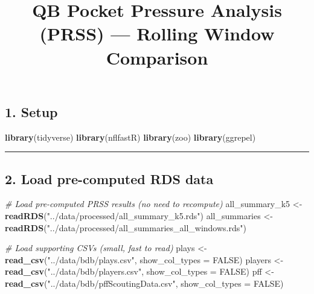 \documentclass[
]{article}
\title{QB Pocket Pressure Analysis (PRSS) --- Rolling Window Comparison}
\author{}
\date{\vspace{-2.5em}}
\newenvironment{Shaded}{\begin{snugshade}}{\end{snugshade}}
\newcommand{\AttributeTok}[1]{\textcolor[rgb]{0.13,0.29,0.53}{#1}}
\newcommand{\CommentTok}[1]{\textcolor[rgb]{0.56,0.35,0.01}{\textit{#1}}}
\newcommand{\ConstantTok}[1]{\textcolor[rgb]{0.56,0.35,0.01}{#1}}
\newcommand{\FunctionTok}[1]{\textcolor[rgb]{0.13,0.29,0.53}{\textbf{#1}}}
\newcommand{\NormalTok}[1]{#1}
\newcommand{\OtherTok}[1]{\textcolor[rgb]{0.56,0.35,0.01}{#1}}
\newcommand{\StringTok}[1]{\textcolor[rgb]{0.31,0.60,0.02}{#1}}
\begin{document}
\maketitle

\subsection{1. Setup}\label{setup}

\begin{Shaded}
\begin{Highlighting}[]
\FunctionTok{library}\NormalTok{(tidyverse)}
\FunctionTok{library}\NormalTok{(nflfastR)}
\FunctionTok{library}\NormalTok{(zoo)}
\FunctionTok{library}\NormalTok{(ggrepel)}
\end{Highlighting}
\end{Shaded}

\begin{center}\rule{0.5\linewidth}{0.5pt}\end{center}

\subsection{2. Load pre-computed RDS
data}\label{load-pre-computed-rds-data}

\begin{Shaded}
\begin{Highlighting}[]
\CommentTok{\# Load pre{-}computed PRSS results (no need to recompute)}
\NormalTok{all\_summary\_k5   }\OtherTok{\textless{}{-}} \FunctionTok{readRDS}\NormalTok{(}\StringTok{"../data/processed/all\_summary\_k5.rds"}\NormalTok{)}
\NormalTok{all\_summaries    }\OtherTok{\textless{}{-}} \FunctionTok{readRDS}\NormalTok{(}\StringTok{"../data/processed/all\_summaries\_all\_windows.rds"}\NormalTok{)}

\CommentTok{\# Load supporting CSVs (small, fast to read)}
\NormalTok{plays   }\OtherTok{\textless{}{-}} \FunctionTok{read\_csv}\NormalTok{(}\StringTok{"../data/bdb/plays.csv"}\NormalTok{,           }\AttributeTok{show\_col\_types =} \ConstantTok{FALSE}\NormalTok{)}
\NormalTok{players }\OtherTok{\textless{}{-}} \FunctionTok{read\_csv}\NormalTok{(}\StringTok{"../data/bdb/players.csv"}\NormalTok{,          }\AttributeTok{show\_col\_types =} \ConstantTok{FALSE}\NormalTok{)}
\NormalTok{pff     }\OtherTok{\textless{}{-}} \FunctionTok{read\_csv}\NormalTok{(}\StringTok{"../data/bdb/pffScoutingData.csv"}\NormalTok{,  }\AttributeTok{show\_col\_types =} \ConstantTok{FALSE}\NormalTok{)}
\end{Highlighting}
\end{Shaded}
\end{document}
